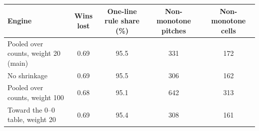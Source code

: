 \begin{tabular}{lcccc}
\toprule
Engine & Wins lost & One-line rule share (\%) & Non-monotone pitches & Non-monotone cells \\
\midrule
Pooled over counts, weight 20 (main) & 0.69 & 95.5 & 331 & 172 \\
No shrinkage & 0.69 & 95.5 & 306 & 162 \\
Pooled over counts, weight 100 & 0.68 & 95.1 & 642 & 313 \\
Toward the 0--0 table, weight 20 & 0.69 & 95.4 & 308 & 161 \\
\bottomrule
\end{tabular}
